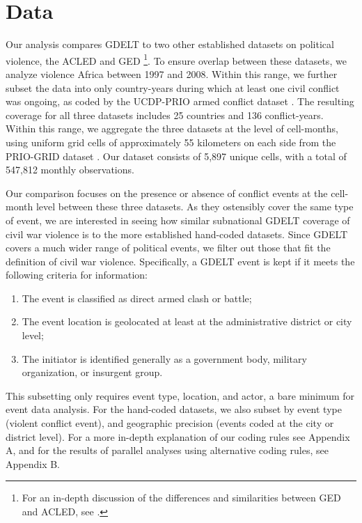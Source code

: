 \documentclass[hidelinks]{article}
\begin{document}
\section*{Data}

Our analysis compares GDELT to two other established datasets on political violence, the ACLED \citep{raleigh10acled} and GED \citep{sundberg13introducing}\footnote{For an in-depth discussion of the differences and similarities between GED and ACLED, see \citep{eck12ged}.}. To ensure overlap between these datasets, we analyze violence Africa between 1997 and 2008. Within this range, we further subset the data into only country-years during which at least one civil conflict was ongoing, as coded by the UCDP-PRIO armed conflict dataset \citep{themner13armed}. The resulting coverage for all three datasets includes 25 countries and 136 conflict-years. Within this range, we aggregate the three datasets at the level of cell-months, using uniform grid cells of approximately 55 kilometers on each side from the PRIO-GRID dataset \citep{tollefsen12priogrid}. Our dataset consists of 5,897 unique cells, with a total of 547,812 monthly observations.

Our comparison focuses on the presence or absence of conflict events at the cell-month level between these three datasets. As they ostensibly cover the same type of event, we are interested in seeing how similar subnational GDELT coverage of civil war violence is to the more established hand-coded datasets. Since GDELT covers a much wider range of political events, we filter out those that fit the definition of civil war violence. Specifically, a GDELT event is kept if it meets the following criteria for information:
\begin{enumerate}
\item The event is classified as direct armed clash or battle;
\item The event location is geolocated at least at the administrative district or city level;
\item The initiator is identified generally as a government body, military organization, or insurgent group.
\end{enumerate}
This subsetting only requires event type, location, and actor, a bare minimum for event data analysis. For the hand-coded datasets, we also subset by event type (violent conflict event), and geographic precision (events coded at the city or district level). For a more in-depth explanation of our coding rules see Appendix A, and for the results of parallel analyses using alternative coding rules, see Appendix B. 
\end{document}
